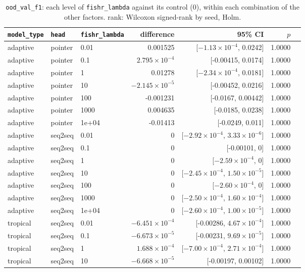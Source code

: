 \documentclass[10pt]{article}
\begin{document}
{\small
\begin{longtable}{lllrrrl}
\caption{\texttt{ood\_val\_f1}: each level of \texttt{fishr\_lambda} against its control (0), within each combination of the other factors. rank: Wilcoxon signed-rank by seed, Holm.}\label{tab:control-ood_val_f1}\\
\toprule
\texttt{model\_type} & \texttt{head} & \texttt{fishr\_lambda} & difference & 95\% CI & $p$ & \\
\midrule
\endhead
adaptive & pointer & 0.01 & 0.001525 & [$-1.13\times10^{-4}$, 0.0242] & 1.0000 & \\
adaptive & pointer & 0.1 & $2.795\times10^{-4}$ & [-0.00415, 0.0174] & 1.0000 & \\
adaptive & pointer & 1 & 0.01278 & [$-2.34\times10^{-4}$, 0.0181] & 1.0000 & \\
adaptive & pointer & 10 & $-2.145\times10^{-5}$ & [-0.00452, 0.0216] & 1.0000 & \\
adaptive & pointer & 100 & -0.001231 & [-0.0167, 0.00442] & 1.0000 & \\
adaptive & pointer & 1000 & 0.004635 & [-0.0185, 0.0238] & 1.0000 & \\
adaptive & pointer & 1e+04 & -0.01413 & [-0.0249, 0.011] & 1.0000 & \\
adaptive & seq2seq & 0.01 & 0 & [$-2.92\times10^{-4}$, $3.33\times10^{-6}$] & 1.0000 & \\
adaptive & seq2seq & 0.1 & 0 & [-0.00101, 0] & 1.0000 & \\
adaptive & seq2seq & 1 & 0 & [$-2.59\times10^{-4}$, 0] & 1.0000 & \\
adaptive & seq2seq & 10 & 0 & [$-2.45\times10^{-4}$, $1.50\times10^{-5}$] & 1.0000 & \\
adaptive & seq2seq & 100 & 0 & [$-2.60\times10^{-4}$, 0] & 1.0000 & \\
adaptive & seq2seq & 1000 & 0 & [$-2.50\times10^{-4}$, $1.60\times10^{-4}$] & 1.0000 & \\
adaptive & seq2seq & 1e+04 & 0 & [$-2.60\times10^{-4}$, $1.00\times10^{-5}$] & 1.0000 & \\
tropical & seq2seq & 0.01 & $-6.451\times10^{-4}$ & [-0.00286, $4.67\times10^{-4}$] & 1.0000 & \\
tropical & seq2seq & 0.1 & $-6.673\times10^{-5}$ & [-0.00231, $9.69\times10^{-5}$] & 1.0000 & \\
tropical & seq2seq & 1 & $1.688\times10^{-4}$ & [$-7.00\times10^{-4}$, $2.71\times10^{-4}$] & 1.0000 & \\
tropical & seq2seq & 10 & $-6.668\times10^{-5}$ & [-0.00197, 0.00102] & 1.0000 & \\

\end{longtable}}
\end{document}
